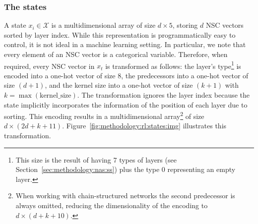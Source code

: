 \subsubsection{The states}\label{sec:methodology:rl:states}

A state $x_i \in \mathcal{X}$ is a multidimensional array of size $d \times 5$, storing $d$ NSC vectors sorted by layer index.
While this representation is programmatically easy to control, it is not ideal in a machine learning setting. In particular, we note that every element of an NSC vector is a categorical variable. Therefore, when required, every NSC vector in $x_t$ is transformed as follows: 
the layer's type\footnote{This size is the result of having 7 types of layers (see Section~\ref{sec:methodology:nas:ss}) plus the type 0 representing an empty layer.} is encoded into a one-hot vector of size 8, the predecessors into a one-hot vector of size $(d+1)$, and the kernel size into a one-hot vector of size $(k+1)$ with $k=\max(\text{kernel\_size})$. The transformation ignores the layer index because the state implicitly incorporates the information of the position of each layer due to sorting. This encoding results in a multidimensional array\footnote{When working with chain-structured networks the second predecessor is always omitted, reducing the dimensionality of the encoding to $d \times (d + k + 10)$.} of size $d \times (2d + k + 11)$. Figure~\ref{fig:methodology:rl:states:img} illustrates this transformation.


